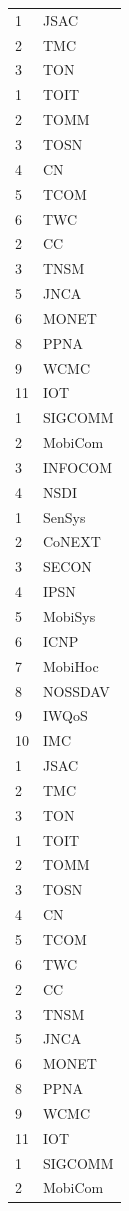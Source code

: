 \documentclass[QingNianC, vlined, timesmathnogreek]{nsfc}
\begin{document}
\begin{longtable}{p{2em} p{4.5em}}
		1 & JSAC \\
		2 & TMC \\
		3 & TON \\
		1 & TOIT \\
		2 & TOMM \\
		3 & TOSN \\
		4 & CN \\
		5 & TCOM \\
		6 & TWC \\
		2 & CC \\
		3 & TNSM \\
		5 & JNCA \\
		6 & MONET \\
		8 & PPNA \\
		9 & WCMC \\
		11 & IOT \\
		1 & SIGCOMM \\
		2 & MobiCom \\
		3 & INFOCOM \\
		4 & NSDI \\
		1 & SenSys \\
		2 & CoNEXT \\
		3 & SECON \\
		4 & IPSN \\
		5 & MobiSys \\
		6 & ICNP \\
		7 & MobiHoc \\
		8 & NOSSDAV \\
		9 & IWQoS \\
		10 & IMC \\
		1 & JSAC \\
		2 & TMC \\
		3 & TON \\
		1 & TOIT \\
		2 & TOMM \\
		3 & TOSN \\
		4 & CN \\
		5 & TCOM \\
		6 & TWC \\
		2 & CC \\
		3 & TNSM \\
		5 & JNCA \\
		6 & MONET \\
		8 & PPNA \\
		9 & WCMC \\
		11 & IOT \\
		1 & SIGCOMM \\
		2 & MobiCom \\

\end{longtable}
\end{document}

